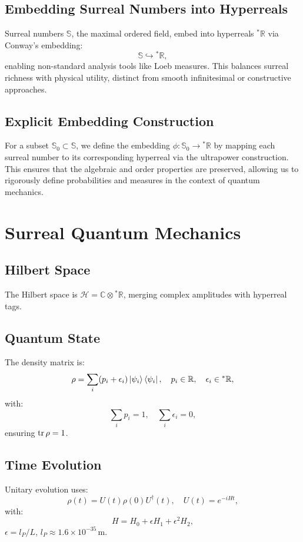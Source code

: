 \documentclass{article}
\begin{document}
\subsection{Embedding Surreal Numbers into Hyperreals}
Surreal numbers \(\mathbb{S}\), the maximal ordered field, embed into hyperreals \({}^*\mathbb{R}\) via Conway’s embedding:
\begin{equation}
\mathbb{S} \hookrightarrow {}^*\mathbb{R},
\end{equation}
enabling non-standard analysis tools like Loeb measures. This balances surreal richness with physical utility, distinct from smooth infinitesimal or constructive approaches.

\subsection{Explicit Embedding Construction}
For a subset \(\mathbb{S}_0 \subset \mathbb{S}\), we define the embedding \(\phi: \mathbb{S}_0 \to {}^*\mathbb{R}\) by mapping each surreal number to its corresponding hyperreal via the ultrapower construction. This ensures that the algebraic and order properties are preserved, allowing us to rigorously define probabilities and measures in the context of quantum mechanics.

\section{Surreal Quantum Mechanics}
\subsection{Hilbert Space}
The Hilbert space is \(\mathcal{H} = \mathbb{C} \otimes {}^*\mathbb{R}\), merging complex amplitudes with hyperreal tags.

\subsection{Quantum State}
The density matrix is:
\begin{equation}
\rho = \sum_i (p_i + \epsilon_i) \ket{\psi_i}\bra{\psi_i}, \quad p_i \in \mathbb{R}, \quad \epsilon_i \in {}^*\mathbb{R},
\end{equation}
with:
\begin{equation}
\sum_i p_i = 1, \quad \sum_i \epsilon_i = 0,
\end{equation}
ensuring \(\tr \rho = 1\).

\subsection{Time Evolution}
Unitary evolution uses:
\begin{equation}
\rho(t) = U(t) \rho(0) U^\dagger(t), \quad U(t) = e^{-i H t},
\end{equation}
with:
\begin{equation}
H = H_0 + \epsilon H_1 + \epsilon^2 H_2,
\end{equation}
\(\epsilon = l_P / L\), \(l_P \approx 1.6 \times 10^{-35} \, \text{m}\).
\end{document}
